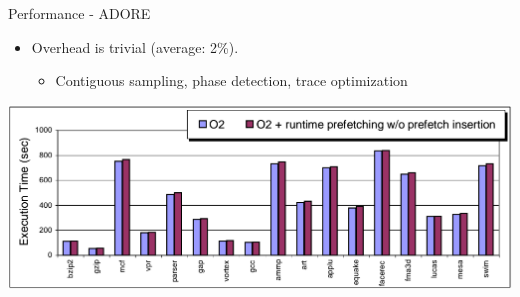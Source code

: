 \documentclass[aspectratio=169,xcolor=x11names]{beamer}
\begin{document}
	\begin{frame}{Performance - ADORE}
		\begin{itemize}
			\item Overhead is trivial (average: 2\%).
			\begin{itemize}
				\item Contiguous sampling, phase detection, trace optimization
			\end{itemize}
		\end{itemize}
	
		\includegraphics[width=\textwidth]{ADORE-overhead}
	\end{frame}
\end{document}
